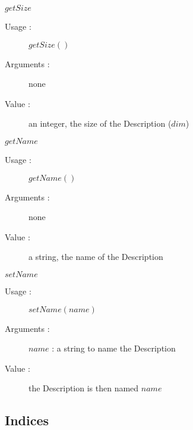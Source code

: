 \begin{description}
\begin{description}
  \item $getSize$
    \begin{description}
    \item[Usage :] $getSize()$
    \item[Arguments :] none
    \item[Value :] an integer, the size of the Description ($dim$)
    \end{description}
    \bigskip


  \item $getName$
    \begin{description}
    \item[Usage :] $getName()$
    \item[Arguments :] none
    \item[Value :] a string, the name of the Description
    \end{description}
    \bigskip

  \item $setName$
    \begin{description}
    \item[Usage :] $setName(name)$
    \item[Arguments :] $name$ : a string to name the Description
    \item[Value :] the Description is then named $name$
    \end{description}
    \bigskip

  \end{description}
\end{description}


\newpage \subsection{Indices}

